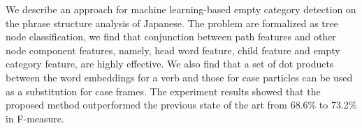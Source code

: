 We describe an approach for machine learning-based empty category detection on the phrase structure analysis of Japanese. The problem are formalized as tree node classification, we find that conjunction between path features and other node component features, namely, head word feature, child feature and empty category feature, are highly effective. We also find that a set of dot products between the word embeddings for a verb and those for case particles can be used as a substitution for case frames. The experiment results showed that the proposed method outperformed the previous state of the art from 68.6\% to 73.2\% in F-measure.
